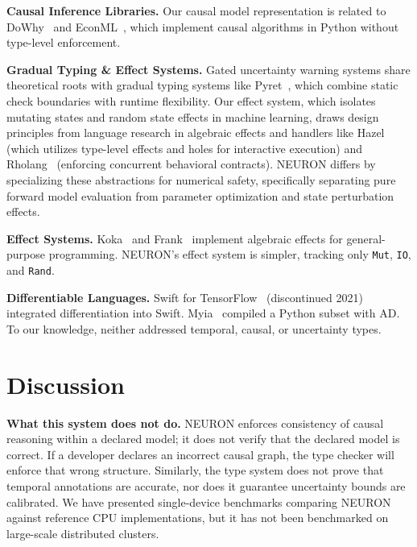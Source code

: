\documentclass[11pt,a4paper]{article}
\newcommand{\ty}[1]{\texttt{#1}}
\begin{document}
\textbf{Causal Inference Libraries.} Our causal model representation is related to DoWhy~\cite{sharma2020} and EconML~\cite{battocchi2019}, which implement causal algorithms in Python without type-level enforcement.

\textbf{Gradual Typing \& Effect Systems.} Gated uncertainty warning systems share theoretical roots with gradual typing systems like Pyret~\cite{pyret2016}, which combine static check boundaries with runtime flexibility. Our effect system, which isolates mutating states and random state effects in machine learning, draws design principles from language research in algebraic effects and handlers like Hazel~\cite{hazel2018} (which utilizes type-level effects and holes for interactive execution) and Rholang~\cite{rholang2017} (enforcing concurrent behavioral contracts). NEURON differs by specializing these abstractions for numerical safety, specifically separating pure forward model evaluation from parameter optimization and state perturbation effects.

\textbf{Effect Systems.} Koka~\cite{leijen2017} and Frank~\cite{lindley2017} implement algebraic effects for general-purpose programming. NEURON's effect system is simpler, tracking only \ty{Mut}, \ty{IO}, and \ty{Rand}.

\textbf{Differentiable Languages.} Swift for TensorFlow~\cite{wei2019} (discontinued 2021) integrated differentiation into Swift. Myia~\cite{vanmerrienboer2019} compiled a Python subset with AD. To our knowledge, neither addressed temporal, causal, or uncertainty types.


\section{Discussion}

\textbf{What this system does not do.} NEURON enforces consistency of causal reasoning within a declared model; it does not verify that the declared model is correct. If a developer declares an incorrect causal graph, the type checker will enforce that wrong structure. Similarly, the type system does not prove that temporal annotations are accurate, nor does it guarantee uncertainty bounds are calibrated. We have presented single-device benchmarks comparing NEURON against reference CPU implementations, but it has not been benchmarked on large-scale distributed clusters.
\end{document}
